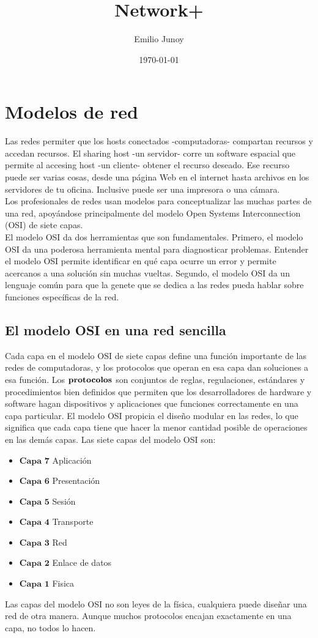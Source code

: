 \documentclass[12pt]{report}
\title{Network+}
\author{Emilio Junoy}
\date{\today}
\begin{document}
\chapter{Modelos de red}
Las redes permiter que los hosts conectados -computadoras- compartan 
recursos y accedan recursos. El sharing host -un servidor- corre
un software espacial que permite al accesing host -un cliente- obtener
el recurso deseado. Ese recurso puede ser varias cosas, desde 
una página Web en el internet hasta archivos en los servidores 
de tu oficina. Inclusive puede ser una impresora o una cámara.\\

Los profesionales de redes usan modelos para conceptualizar las muchas partes
de una red, apoyándose principalmente del modelo Open Systems Interconnection (OSI)
de siete capas.\\

El modelo OSI da dos herramientas que son fundamentales. Primero,
el modelo OSI da una poderosa herramienta mental para diagnosticar problemas.
Entender el modelo OSI permite identificar en qué capa ocurre un error y
permite acercanos a una solución sin muchas vueltas.
Segundo, el modelo OSI da un lenguaje común para que la genete que se 
dedica a las redes pueda hablar sobre funciones específicas de la red.

\section{El modelo OSI en una red sencilla}
Cada capa en el modelo OSI de siete capas define una función importante de 
las redes de computadoras, y los protocolos que operan en esa capa dan soluciones
a esa función. Los $\bf{protocolos}$ son conjuntos de reglas, regulaciones, 
estándares y procedimientos bien definidos que permiten que los 
desarrolladores de hardware y software hagan dispositivos y aplicaciones 
que funciones correctamente en una capa particular. 
El modelo OSI propicia el diseño modular en las redes, lo que significa que cada
capa tiene que hacer la menor cantidad posible de operaciones en las demás capas.
Las siete capas del modelo OSI son:
\begin{itemize}
  \item $\textbf{Capa 7}$ Aplicación
  \item $\textbf{Capa 6}$ Presentación
  \item $\textbf{Capa 5}$ Sesión 
  \item $\textbf{Capa 4}$ Transporte
  \item $\textbf{Capa 3}$ Red 
  \item $\textbf{Capa 2}$ Enlace de datos
  \item $\textbf{Capa 1}$ Fisica
\end{itemize}
Las capas del modelo OSI no son leyes de la física, cualquiera puede diseñar una
red de otra manera. Aunque muchos protocolos encajan exactamente en una capa, 
no todos lo hacen.\\
\end{document}
